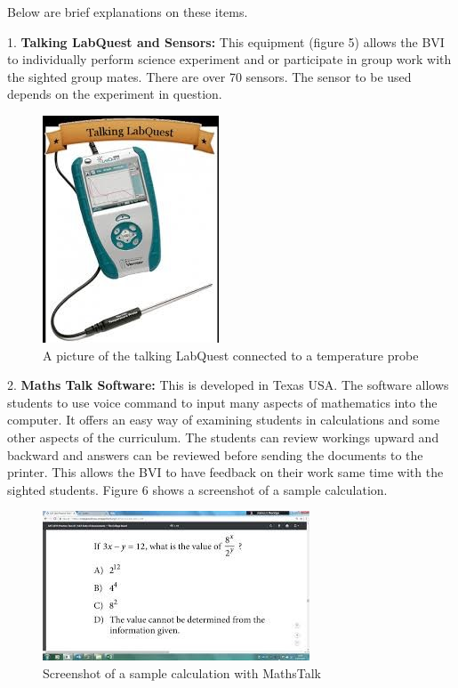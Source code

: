 \documentclass[11.5pt]{sig-alternate} %
\begin{document}
\begin{large}
Below are brief explanations on these items.

1. \textbf{Talking LabQuest and Sensors:} This equipment (figure 5) allows the BVI to individually perform science experiment and or participate in group work with the sighted group mates. There are over 70 sensors. The sensor to be used depends on the experiment in question.

\begin{figure}[h]
    \centering
    \includegraphics[width=0.6\linewidth]{images/fig5.jpg}
    \caption{A picture of the talking LabQuest connected to a temperature probe}
\end{figure}

2. \textbf{Maths Talk Software:} This is developed in Texas USA. The software allows students to use voice command to input many aspects of mathematics into the computer. It offers an easy way of examining students in calculations and some other aspects of the curriculum. The students can review workings upward and backward and answers can be reviewed before sending the documents to the printer. This allows the BVI to have feedback on their work same time with the sighted students. Figure 6 shows a screenshot of a sample calculation.

\begin{figure}[h]
    \centering
    \includegraphics[width=1\linewidth]{images/fig6.jpg}
    \caption{Screenshot of a sample calculation with MathsTalk}
\end{figure}


\end{large}
\end{document}
